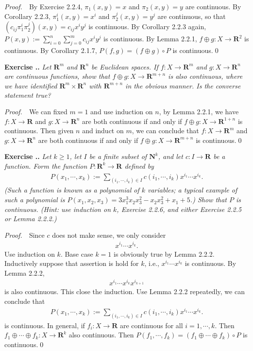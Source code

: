 \documentclass{book}
\newcommand{\pff}{\vspace{.25em}\noindent\emph{Proof.}~~}
\newcounter{Exercise}[section]
\renewcommand{\theExercise}{\thesection.\arabic{Exercise}.}
\newcommand{\new}{\vspace{1.5em}\noindent\textbf{Exercise \stepcounter{Exercise}\textbf{\theExercise}} }
\begin{document}
\pff By Exercise 2.2.4, $\pi_{1}(x,y)=x$ and $\pi_{2}(x,y)=y$ are continuous. By Corollary 2.2.3, $\pi_{1}^i(x,y)=x^i$ and $\pi_{2}^j(x,y)=y^j$ are continuous, so that $(c_{ij}\pi_{1}^i\pi_{2}^j)(x,y)=c_{ij}x^iy^j$ is continuous. By Corollary 2.2.3 again, $P(x,y):=\sum_{i=0}^{n}\sum_{j=0}^{m}c_{ij}x^iy^j$ is continuous. By Lemma 2.2.1, $f\oplus g:X\to\mathbf{R}^2$ is continuous. By Corollary 2.1.7, $P(f,g)=(f\oplus g)\circ P$ is continuous.\qed

\new\emph{Let $\mathbf{R}^m$ and $\mathbf{R}^n$ be Euclidean spaces. If $f:X\to\mathbf{R}^m$ and $g:X\to\mathbf{R}^n$ are continuous functions, show that $f\oplus g:X\to\mathbf{R}^{m+n}$ is also continuous, where we have identified $\mathbf{R}^m\times\mathbf{R}^n$ with $\mathbf{R}^{m+n}$ in the obvious manner. Is the converse statement true?}

\pff We can fixed $m=1$ and use induction on $n$, by Lemma 2.2.1, we have $f:X\to\mathbf{R}$ and $g:X\to\mathbf{R}^n$ are both continuous if and only if $f\oplus g:X\to\mathbf{R}^{1+n}$ is continuous. Then given $n$ and induct on $m$, we can conclude that $f:X\to\mathbf{R}^m$ and $g:X\to\mathbf{R}^n$ are both continuous if and only if $f\oplus g:X\to\mathbf{R}^{m+n}$ is continuous.\qed

\new\emph{Let $k\geq 1$, let $I$ be a finite subset of $\mathbf{N}^k$, and let $c:I\to\mathbf{R}$ be a function. Form the function $P:\mathbf{R}^k\to\mathbf{R}$ defined by}
    \begin{align*}
        P(x_1,\cdots,x_k):=\sum_{(i_1,\cdots,i_k)\in I}c(i_1,\cdots,i_k)x^{i_1}\cdots x^{i_k}.
    \end{align*}
\emph{(Such a function is known as a \textnormal{polynomial of $k$ variables}; a typical example of such a polynomial is $P(x_1,x_2,x_3) =3x^3_1x_2x^2_3-x_2x^2_3+x_1+5$.) Show that $P$ is continuous. (Hint: use induction on $k$, Exercise 2.2.6, and either Exercise 2.2.5 or Lemma 2.2.2.)}

\pff Since $c$ does not make sense, we only consider
    \begin{align*}
        x^{i_1}\cdots x^{i_k}.
    \end{align*}
Use induction on $k$. Base case $k=1$ is obviously true by Lemma 2.2.2. Inductively suppose that assertion is hold for $k$, i.e., $x^{i_1}\cdots x^{i_k}$ is continuous. By Lemma 2.2.2,
    \begin{align*}
        x^{i_1}\cdots x^{i_k}x^{i_{k+1}}
    \end{align*}
is also continuous. This close the induction. Use Lemma 2.2.2 repeatedly, we can conclude that
    \begin{align*}
        P(x_1,\cdots,x_k):=\sum_{(i_1,\cdots,i_k)\in I}c(i_1,\cdots,i_k)x^{i_1}\cdots x^{i_k}.
    \end{align*}
is continuous. In general, if $f_i:X\to\mathbf{R}$ are continuous for all $i=1,\cdots,k$. Then $f_1\oplus\cdots\oplus f_k:X\to\mathbf{R}^k$ also continuous. Then $P(f_1,\cdots,f_k)=(f_1\oplus\cdots\oplus f_k)\circ P$ is continuous.\qed
\end{document}
